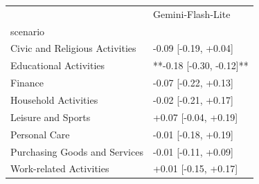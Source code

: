 \begin{tabular}{ll}
\toprule
 & Gemini-Flash-Lite \\
scenario &  \\
\midrule
Civic and Religious Activities & -0.09 [-0.19, +0.04] \\
Educational Activities & **-0.18 [-0.30, -0.12]** \\
Finance & -0.07 [-0.22, +0.13] \\
Household Activities & -0.02 [-0.21, +0.17] \\
Leisure and Sports & +0.07 [-0.04, +0.19] \\
Personal Care & -0.01 [-0.18, +0.19] \\
Purchasing Goods and Services & -0.01 [-0.11, +0.09] \\
Work-related Activities & +0.01 [-0.15, +0.17] \\
\bottomrule
\end{tabular}
